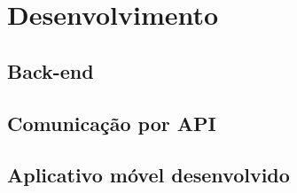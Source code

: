 \chapter{Desenvolvimento}

\section{Back-end}

\lipsum[1]

\section{Comunicação por API}

\lipsum[1]

\section{Aplicativo móvel desenvolvido}


\lipsum[1]